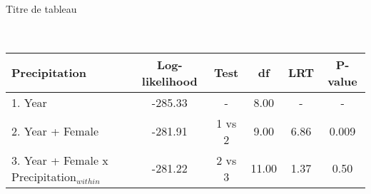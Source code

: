 \begin{table}[ht]
\centering
\caption[Titre de tableau]{\label{ch2table1} Titre de tableau} %
\begin{tabular}{lccccc}%
\toprule
Precipitation & Log-likelihood & Test & df & LRT & P-value \\ %
\hline
1. Year & -285.33 & - & 8.00 & - & - \\ 
  2. Year + Female & -281.91 & 1 vs 2 & 9.00 & 6.86 & 0.009 \\ 
  3. Year + Female x Precipitation$_{within}$ & -281.22 & 2 vs 3 & 11.00 & 1.37 & 0.50 \\
\bottomrule
\end{tabular}%
\medskip
\captionsetup{labelformat=empty}
\caption[]{\qquad\qquad\quad\ } %
\end{table}
